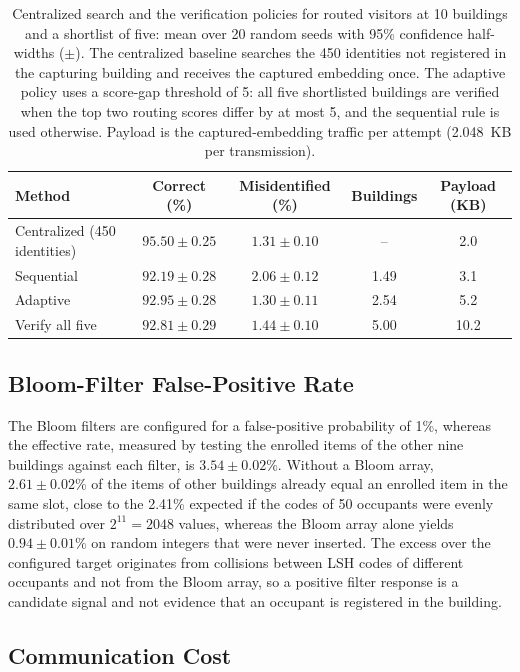 \documentclass[pdflatex,sn-mathphys-num]{sn-jnl}%
\theoremstyle{thmstyleone}%
\theoremstyle{thmstyletwo}%
\theoremstyle{thmstylethree}%
\begin{document}
\begin{table}[!t]
\caption{Centralized search and the verification policies for routed visitors at 10 buildings and a shortlist of five: mean over 20 random seeds with 95\% confidence half-widths ($\pm$). The centralized baseline searches the 450 identities not registered in the capturing building and receives the captured embedding once. The adaptive policy uses a score-gap threshold of 5: all five shortlisted buildings are verified when the top two routing scores differ by at most 5, and the sequential rule is used otherwise. Payload is the captured-embedding traffic per attempt (2.048~KB per transmission).}\label{tab:adaptive}%
\begin{tabular}{@{}lcccc@{}}
\toprule
Method & Correct (\%) & Misidentified (\%) & Buildings & Payload (KB) \\
\midrule
Centralized (450 identities) & $95.50 \pm 0.25$ & $1.31 \pm 0.10$ & -- & 2.0 \\
Sequential & $92.19 \pm 0.28$ & $2.06 \pm 0.12$ & 1.49 & 3.1 \\
Adaptive & $92.95 \pm 0.28$ & $1.30 \pm 0.11$ & 2.54 & 5.2 \\
Verify all five & $92.81 \pm 0.29$ & $1.44 \pm 0.10$ & 5.00 & 10.2 \\
\bottomrule
\end{tabular}
\end{table}

\subsection{Bloom-Filter False-Positive Rate}
\label{sec:fpr}

The Bloom filters are configured for a false-positive probability of 1\%, whereas the effective rate, measured by testing the enrolled items of the other nine buildings against each filter, is $3.54 \pm 0.02\%$. Without a Bloom array, $2.61 \pm 0.02\%$ of the items of other buildings already equal an enrolled item in the same slot, close to the 2.41\% expected if the codes of 50 occupants were evenly distributed over $2^{11}=2048$ values, whereas the Bloom array alone yields $0.94 \pm 0.01\%$ on random integers that were never inserted. The excess over the configured target originates from collisions between LSH codes of different occupants and not from the Bloom array, so a positive filter response is a candidate signal and not evidence that an occupant is registered in the building.

\subsection{Communication Cost}
\label{sec:cost}
\end{document}
